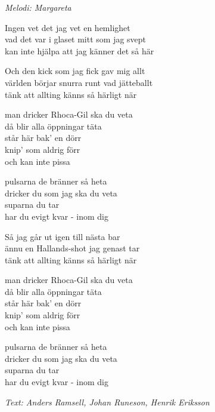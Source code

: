 {\footnotesize\textit{Melodi: Margareta}}\par
\vspace{10pt}
Ingen vet det jag vet en hemlighet\\
vad det var i glaset mitt som jag svept\\
kan inte hjälpa att jag känner det så här\par
\vspace{10pt}
Och den kick som jag fick gav mig allt\\
världen börjar snurra runt vad jätteballt\\
tänk att allting känns så härligt när\par
\vspace{10pt}
man dricker Rhoca-Gil ska du veta \\
då blir alla öppningar täta\\
står här bak' en dörr\\
knip' som aldrig förr\\
och kan inte pissa\par
\vspace{10pt}
pulsarna de bränner så heta\\
dricker du som jag ska du veta\\
suparna du tar\\
har du evigt kvar - inom dig\par
\vspace{10pt}
Så jag går ut igen till nästa bar\\
ännu en Hallands-shot jag genast tar\\
tänk att allting känns så härligt när\par
\vspace{10pt}
man dricker Rhoca-Gil ska du veta \\
då blir alla öppningar täta\\
står här bak' en dörr\\
knip' som aldrig förr\\
och kan inte pissa

pulsarna de bränner så heta\\
dricker du som jag ska du veta\\
suparna du tar \\
har du evigt kvar - inom dig\par
\vspace{10pt}
{\footnotesize\textit{Text: Anders Ramsell, Johan Runeson, Henrik Eriksson}}
